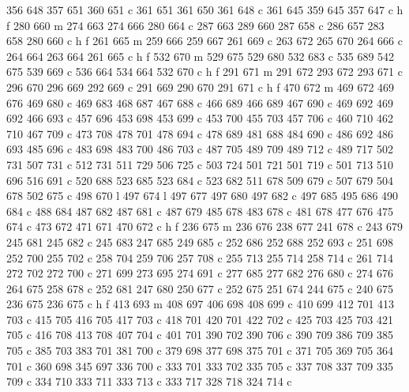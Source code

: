 {{        356 648 357 651 360 651 c
        361 651 361 650 361 648 c
        361 645 359 645 357 647 c
        h f
        280 660 m
        274 663 274 666 280 664 c
        287 663 289 660 287 658 c
        286 657 283 658 280 660 c
        h f
        261 665 m
        259 666 259 667 261 669 c
        263 672 265 670 264 666 c
        264 664 263 664 261 665 c
        h f
        532 670 m
        529 675 529 680 532 683 c
        535 689 542 675 539 669 c
        536 664 534 664 532 670 c
        h f
        291 671 m
        291 672 293 672 293 671 c
        296 670 296 669 292 669 c
        291 669 290 670 291 671 c
        h f
        470 672 m
        469 672 469 676 469 680 c
        469 683 468 687 467 688 c
        466 689 466 689 467 690 c
        469 692 469 692 466 693 c
        457 696 453 698 453 699 c
        453 700 455 703 457 706 c
        460 710 462 710 467 709 c
        473 708 478 701 478 694 c
        478 689 481 688 484 690 c
        486 692 486 693 485 696 c
        483 698 483 700 486 703 c
        487 705 489 709 489 712 c
        489 717 502 731 507 731 c
        512 731 511 729 506 725 c
        503 724 501 721 501 719 c
        501 713 510 696 516 691 c
        520 688 523 685 523 684 c
        523 682 511 678 509 679 c
        507 679 504 678 502 675 c
        498 670 l
        497 674 l
        497 677 497 680 497 682 c
        497 685 495 686 490 684 c
        488 684 487 682 487 681 c
        487 679 485 678 483 678 c
        481 678 477 676 475 674 c
        473 672 471 671 470 672 c
        h f
        236 675 m
        236 676 238 677 241 678 c
        243 679 245 681 245 682 c
        245 683 247 685 249 685 c
        252 686 252 688 252 693 c
        251 698 252 700 255 702 c
        258 704 259 706 257 708 c
        255 713 255 714 258 714 c
        261 714 272 702 272 700 c
        271 699 273 695 274 691 c
        277 685 277 682 276 680 c
        274 676 264 675 258 678 c
        252 681 247 680 250 677 c
        252 675 251 674 244 675 c
        240 675 236 675 236 675 c
        h f
        413 693 m
        408 697 406 698 408 699 c
        410 699 412 701 413 703 c
        415 705 416 705 417 703 c
        418 701 420 701 422 702 c
        425 703 425 703 421 705 c
        416 708 413 708 407 704 c
        401 701 390 702 390 706 c
        390 709 386 709 385 705 c
        385 703 383 701 381 700 c
        379 698 377 698 375 701 c
        371 705 369 705 364 701 c
        360 698 345 697 336 700 c
        333 701 333 702 335 705 c
        337 708 337 709 335 709 c
        334 710 333 711 333 713 c
        333 717 328 718 324 714 c
}}
